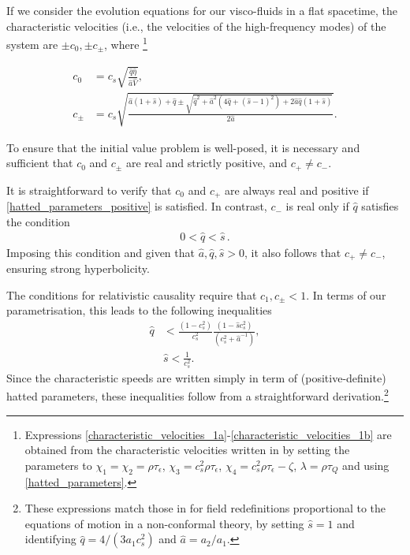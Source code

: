 \documentclass[prd,aps,twocolumn,floats,floatfix,nofootinbib,superscriptaddress] {revtex4-1}
\begin{document}
If we consider the evolution equations for our visco-fluids in a flat spacetime, the characteristic velocities (i.e., the velocities of the high-frequency modes) of the
system are $\pm c_{0},\pm
c_{\pm}$, where \footnote{Expressions \eqref{characteristic_velocities_1a}-\eqref{characteristic_velocities_1b} are obtained from the characteristic velocities written in \cite{Bemfica:2019knx} by setting the parameters to $\chi_1=\chi_2=\rho \tau_{\epsilon}$, $\chi_3=c_s^2 \rho \tau_{\epsilon}$, $\chi_4=c_s^2 \rho \tau_{\epsilon}-\zeta$, $\lambda=\rho\tau_Q$ and using \eqref{hatted_parameters}.  }%
%
\begin{widetext}
\begin{align}
c_{0} &  =c_{s}\sqrt{\frac{\hat{q}\hat{\eta}}{\hat{a}\hat{V}}},\label{characteristic_velocities_1a}\\
c_{\pm} &  =c_{s}\sqrt{\frac{\hat{a}\left(  1+\hat{s}\right)  +\hat{q}\pm
\sqrt{\hat{q}^{2}+\hat{a}^{2}\left(  4\hat{q}+\left(  \hat{s}-1\right)
^{2}\right)  +2\hat{a}\hat{q}\left(  1+\hat{s}\right)  }}{2\hat{a}}}.
\label{characteristic_velocities_1b}
\end{align}
\end{widetext}
To ensure that the initial value problem is well-posed, it is necessary and sufficient that $c_0$ and $c_\pm$ are real and strictly positive,  and  $c_+ \neq c_-$.

It is straightforward to verify that $c_0$ and $c_+$ are always real and positive if  \eqref{hatted_parameters_positive} is satisfied. In contrast, $c_-$ is real only if $\hat{q}$ satisfies the condition  
\begin{align}
	0 < \hat{q} < \hat{s}\,. \label{cond_1}
\end{align}
Imposing this condition and given that $\hat{a}, \hat{q}, \hat{s} > 0$, it also follows that $c_+ \neq c_-$, ensuring strong hyperbolicity.

The conditions for relativistic causality require that $c_1, c_\pm < 1$. In terms of our parametrisation, this leads to the following inequalities
\begin{align}
\hat{q} &  <\frac{\left(  1-c_{s}^{2}\right)  }{c_{s}^{2}}\frac{\left(
1-\hat{s}c_{s}^{2}\right)  }{\left(  c_{s}^{2}+\hat{a}^{-1}\right)
},\label{cond_3} \\ & \hat{s}<\frac{1}{c_{s}^{2}}. \label{cond_4} 
\end{align}
%
Since the characteristic speeds are written simply in term of (positive-definite) hatted parameters, these inequalities follow from a straightforward derivation.\footnote{These expressions match those in \cite{Bea:2025eov} for field redefinitions proportional to the equations of motion in a non-conformal theory, by setting $\hat{s}=1$ and identifying $\hat{q}=4/(3 a_1 c_s^2)$ and $\hat{a}=a_2/a_1$.
} 
\end{document}

